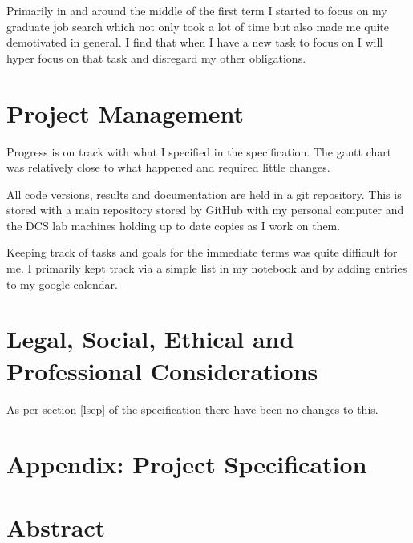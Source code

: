 \documentclass{article}
\begin{document}
Primarily in and around the middle of the first term I started to focus on my graduate job search which not only took a lot of time but also made me quite demotivated in general.
I find that when I have a new task to focus on I will hyper focus on that task and disregard my other obligations.


\section{Project Management}

Progress is on track with what I specified in the specification.
The gantt chart was relatively close to what happened and required little changes.

All code versions, results and documentation are held in a git repository.
This is stored with a main repository stored by GitHub with my personal computer and the DCS lab machines holding up to date copies as I work on them.

Keeping track of tasks and goals for the immediate terms was quite difficult for me.
I primarily kept track via a simple list in my notebook and by adding entries to my google calendar.



\section{Legal, Social, Ethical and Professional Considerations}

As per section \ref{lsep} of the specification there have been no changes to this.

\newpage

\appendix

\section*{Appendix: Project Specification}
\section{Abstract} \label{abstract}
\end{document}
